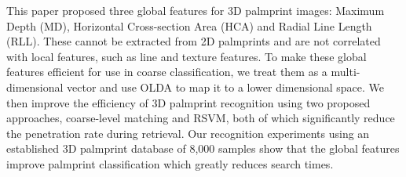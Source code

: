 
This paper proposed three global features for 3D palmprint images: Maximum Depth (MD), Horizontal Cross-section Area (HCA) and Radial Line Length (RLL). These cannot be extracted from 2D palmprints and are not correlated with local features, such as line and texture features. To make these global features efficient for use in coarse classification, we treat them as a multi-dimensional vector and use OLDA to map it to a lower dimensional space. We then improve the efficiency of 3D palmprint recognition using two proposed approaches, coarse-level matching and RSVM, both of which significantly reduce the penetration rate during retrieval. Our recognition experiments using an established 3D palmprint database of 8,000 samples show that the global features improve palmprint classification which greatly reduces search times.